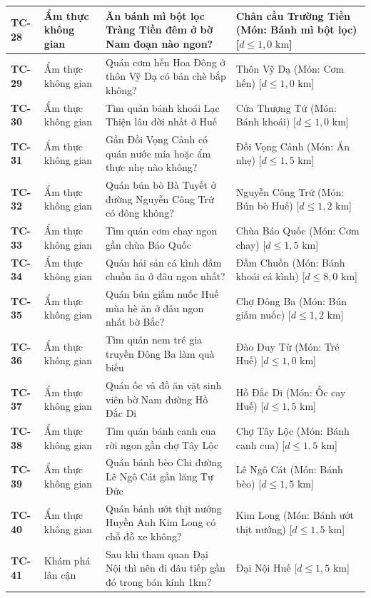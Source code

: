 \begin{longtable}{|>{\centering\arraybackslash\bfseries}p{1.35cm}|>{\raggedright\arraybackslash}p{2.6cm}|>{\raggedright\arraybackslash}p{6.35cm}|>{\raggedright\arraybackslash}p{4.3cm}|}
TC-28 & Ẩm thực không gian & Ăn bánh mì bột lọc Tràng Tiền đêm ở bờ Nam đoạn nào ngon? & Chân cầu Trường Tiền (Món: Bánh mì bột lọc) [$d \le 1{,}0\text{ km}$] \\ \hline
TC-29 & Ẩm thực không gian & Quán cơm hến Hoa Đông ở thôn Vỹ Dạ có bán chè bắp không? & Thôn Vỹ Dạ (Món: Cơm hến) [$d \le 1{,}0\text{ km}$] \\ \hline
TC-30 & Ẩm thực không gian & Tìm quán bánh khoái Lạc Thiện lâu đời nhất ở Huế & Cửa Thượng Tứ (Món: Bánh khoái) [$d \le 1{,}0\text{ km}$] \\ \hline
TC-31 & Ẩm thực không gian & Gần Đồi Vọng Cảnh có quán nước mía hoặc ẩm thực nhẹ nào không? & Đồi Vọng Cảnh (Món: Ăn nhẹ) [$d \le 1{,}5\text{ km}$] \\ \hline
TC-32 & Ẩm thực không gian & Quán bún bò Bà Tuyết ở đường Nguyễn Công Trứ có đông không? & Nguyễn Công Trứ (Món: Bún bò Huế) [$d \le 1{,}2\text{ km}$] \\ \hline
TC-33 & Ẩm thực không gian & Tìm quán cơm chay ngon gần chùa Báo Quốc & Chùa Báo Quốc (Món: Cơm chay) [$d \le 1{,}5\text{ km}$] \\ \hline
TC-34 & Ẩm thực không gian & Quán hải sản cá kình đầm chuồn ăn ở đâu ngon nhất? & Đầm Chuồn (Món: Bánh khoái cá kình) [$d \le 8{,}0\text{ km}$] \\ \hline
TC-35 & Ẩm thực không gian & Quán bún giấm nuốc Huế mùa hè ăn ở đâu ngon nhất bờ Bắc? & Chợ Đông Ba (Món: Bún giấm nuốc) [$d \le 1{,}2\text{ km}$] \\ \hline
TC-36 & Ẩm thực không gian & Tìm quán nem tré gia truyền Đông Ba làm quà biếu & Đào Duy Từ (Món: Tré Huế) [$d \le 1{,}0\text{ km}$] \\ \hline
TC-37 & Ẩm thực không gian & Quán ốc và đồ ăn vặt sinh viên bờ Nam đường Hồ Đắc Di & Hồ Đắc Di (Món: Ốc cay Huế) [$d \le 1{,}5\text{ km}$] \\ \hline
TC-38 & Ẩm thực không gian & Tìm quán bánh canh cua rời ngon gần chợ Tây Lộc & Chợ Tây Lộc (Món: Bánh canh cua) [$d \le 1{,}5\text{ km}$] \\ \hline
TC-39 & Ẩm thực không gian & Quán bánh bèo Chi đường Lê Ngô Cát gần lăng Tự Đức & Lê Ngô Cát (Món: Bánh bèo) [$d \le 1{,}5\text{ km}$] \\ \hline
TC-40 & Ẩm thực không gian & Quán bánh ướt thịt nướng Huyền Anh Kim Long có chỗ đỗ xe không? & Kim Long (Món: Bánh ướt thịt nướng) [$d \le 1{,}5\text{ km}$] \\ \hline
TC-41 & Khám phá lân cận & Sau khi tham quan Đại Nội thì nên đi đâu tiếp gần đó trong bán kính 1km? & Đại Nội Huế [$d \le 1{,}5\text{ km}$] \\ \hline

\end{longtable}
